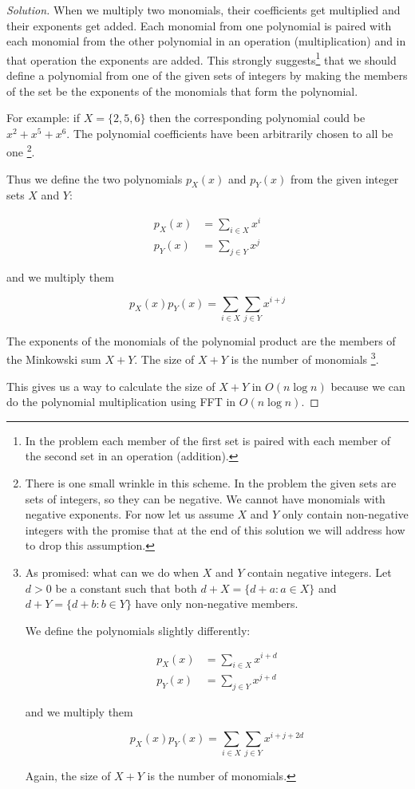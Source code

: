 \begin{proof}[Solution]
When we multiply two monomials, their coefficients get multiplied and their exponents get added. Each monomial from one polynomial is paired with each monomial from the other polynomial in an operation (multiplication) and in that operation the exponents are added. This strongly suggests\footnote{In the problem each member of the first set is paired with each member of the second set in an operation (addition).} that we should define a polynomial from one of the given sets of integers by making the members of the set be the exponents of the monomials that form the polynomial.

For example: if $X=\{2, 5, 6\}$ then the corresponding polynomial could be $x^2 + x^5 + x^6$. The polynomial coefficients have been arbitrarily chosen to all be one
\footnote{There is one small wrinkle in this scheme. In the problem the given sets are sets of integers, so they can be negative. We cannot have monomials with negative exponents. For now let us assume $X$ and $Y$ only contain non-negative integers with the promise that at the end of this solution we will address how to drop this assumption.}.

Thus we define the two polynomials $p_X(x)$ and $p_Y(x)$ from the given integer sets $X$ and $Y$:

\begin{align*}
p_X(x) &= \sum_{i \in X} x^i \\
p_Y(x) &= \sum_{j \in Y} x^j
\end{align*}

and we multiply them

$$
p_X(x) p_Y(x) = \sum_{i \in X} \sum_{j \in Y} x^{i + j}
$$

The exponents of the monomials of the polynomial product are the members of the Minkowski sum $X + Y$. The size of $X + Y$ is the number of monomials \footnote{As promised: what can we do when $X$ and $Y$ contain negative integers. Let $d >0$ be a constant such that both $d + X = \{d + a: a \in X\}$ and $d + Y = \{d + b: b \in Y\}$ have only non-negative members.

We define the polynomials slightly differently:

\begin{align*}
p_X(x) &= \sum_{i \in X} x^{i + d} \\
p_Y(x) &= \sum_{j \in Y} x^{j + d}
\end{align*}

and we multiply them

$$
p_X(x) p_Y(x) = \sum_{i \in X} \sum_{j \in Y} x^{i + j + 2d}
$$

Again, the size of $X + Y$ is the number of monomials.}.

This gives us a way to calculate the size of $X + Y$ in $O(n \log n)$ because we can do the polynomial multiplication using FFT in $O(n \log n)$.
\end{proof}

